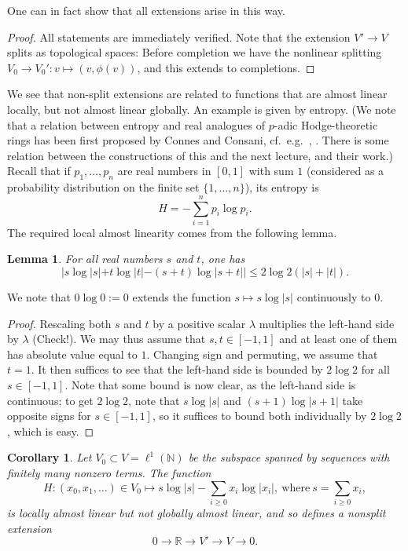 \documentclass[11pt]{amsbook}
\numberwithin{equation}{section}
\numberwithin{theorem}{section}
\newtheorem{lemma}[theorem]{Lemma}
\newtheorem{corollary}[theorem]{Corollary}
\theoremstyle{definition}
\begin{document}
One can in fact show that all extensions arise in this way.

\begin{proof} All statements are immediately verified. Note that the extension $V'\to V$ splits as topological spaces: Before completion we have the nonlinear splitting $V_0\to V_0': v\mapsto (v,\phi(v))$, and this extends to completions.
\end{proof}

We see that non-split extensions are related to functions that are almost linear locally, but not almost linear globally. An example is given by entropy. (We note that a relation between entropy and real analogues of $p$-adic Hodge-theoretic rings has been first proposed by Connes and Consani, cf.~e.g.~\cite{ConnesConsani1}, \cite{ConnesWitt}. There is some relation between the constructions of this and the next lecture, and their work.) Recall that if $p_1,\ldots,p_n$ are real numbers in $[0,1]$ with sum $1$ (considered as a probability distribution on the finite set $\{1,\ldots,n\}$), its entropy is
\[
H=-\sum_{i=1}^n p_i \log p_i.
\]
The required local almost linearity comes from the following lemma.

\begin{lemma}\label{lem:entropyalmostlinear} For all real numbers $s$ and $t$, one has
\[
|s\log|s|+t\log|t|-(s+t)\log|s+t||\leq 2\log 2(|s|+|t|).
\]
\end{lemma}

We note that $0\log 0 := 0$ extends the function $s\mapsto s\log|s|$ continuously to $0$.

\begin{proof} Rescaling both $s$ and $t$ by a positive scalar $\lambda$ multiplies the left-hand side by $\lambda$ (Check!). We may thus assume that $s,t\in [-1,1]$ and at least one of them has absolute value equal to $1$. Changing sign and permuting, we assume that $t=1$. It then suffices to see that the left-hand side is bounded by $2\log 2$ for all $s\in [-1,1]$. Note that some bound is now clear, as the left-hand side is continuous; to get $2\log 2$, note that $s\log|s|$ and $(s+1)\log|s+1|$ take opposite signs for $s\in[-1,1]$, so it suffices to bound both individually by $2\log 2$, which is easy.
\end{proof}

\begin{corollary} Let $V_0\subset V=\ell^1(\mathbb N)$ be the subspace spanned by sequences with finitely many nonzero terms. The function
\[
H: (x_0,x_1,\ldots)\in V_0\mapsto s\log|s| - \sum_{i\geq 0} x_i\log|x_i| ,\ \mathrm{where}\ s=\sum_{i\geq 0} x_i,
\]
is locally almost linear but not globally almost linear, and so defines a nonsplit extension
\[
0\to \mathbb R\to V'\to V\to 0.
\]
\end{corollary}
\end{document}

